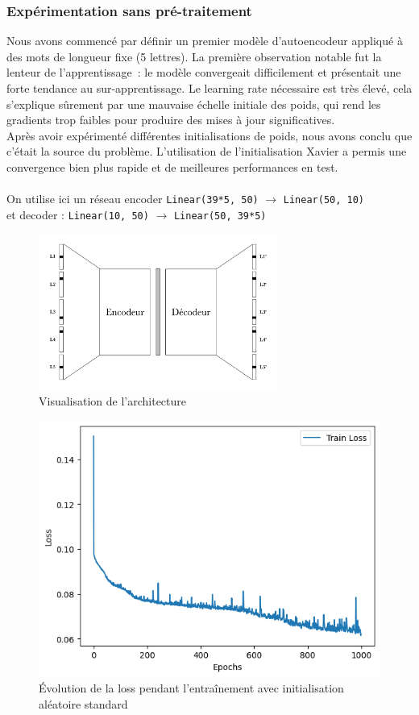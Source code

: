 \documentclass{article}
\begin{document}
\subsubsection{Expérimentation sans pré-traitement}

Nous avons commencé par définir un premier modèle d’autoencodeur appliqué à des mots de longueur fixe (5 lettres). La première observation notable fut la lenteur de l’apprentissage~: le modèle convergeait difficilement et présentait une forte tendance au sur-apprentissage. Le learning rate nécessaire est très élevé, cela s’explique sûrement par une mauvaise échelle initiale des poids, qui rend les gradients trop faibles pour produire des mises à jour significatives.
\\
Après avoir expérimenté différentes initialisations de poids, nous avons conclu que c’était la source du problème. L’utilisation de l’initialisation Xavier a permis une convergence bien plus rapide et de meilleures performances en test.
\\ \\
On utilise ici un réseau encoder \texttt{Linear(39*5, 50)} $\rightarrow$ \texttt{Linear(50, 10)} 
\\
et decoder : \texttt{Linear(10, 50)} $\rightarrow$ \texttt{Linear(50, 39*5)}

\begin{figure}[H]
    \centering
    \includegraphics[width=0.7\textwidth]{Images/encodeur-decodeur.pdf}
    \caption{Visualisation de l'architecture}
    \label{fig:mirror_example}
\end{figure}

\begin{figure}[H]
    \centering
    \includegraphics[width=0.6\linewidth]{Images/loss_no_init.png}
    \caption{Évolution de la loss pendant l’entraînement avec initialisation aléatoire standard}
    \label{fig:loss_no_init}
\end{figure}
\end{document}
